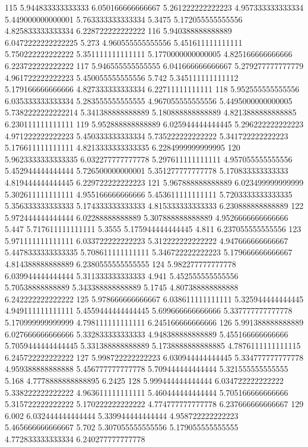 115 5.944833333333333 6.050166666666667 5.261222222222223 4.957333333333334 5.449000000000001 5.763333333333334 5.3475 5.172055555555556 4.825833333333334 6.228722222222222
116 5.940388888888889 6.0472222222222225 5.273 4.960555555555556 5.451611111111111 5.750222222222222 5.351111111111111 5.1770000000000005 4.825166666666666 6.223722222222222
117 5.946555555555555 6.041666666666667 5.279277777777779 4.961722222222223 5.450055555555556 5.742 5.345111111111112 5.179166666666666 4.827333333333334 6.22711111111111
118 5.952555555555556 6.035333333333334 5.283555555555555 4.967055555555556 5.4495000000000005 5.7382222222222214 5.341388888888889 5.180888888888889 4.8213888888888885 6.230111111111111
119 5.952888888888889 6.025944444444445 5.296222222222223 4.971222222222223 5.450333333333334 5.735222222222222 5.341722222222223 5.176611111111111 4.8213333333333335 6.2284999999999995
120 5.9623333333333335 6.032277777777778 5.297611111111111 4.957055555555556 5.452944444444444 5.726500000000001 5.351277777777778 5.170833333333333 4.819444444444445 6.229722222222223
121 5.967888888888889 6.023499999999999 5.302611111111111 4.955166666666666 5.453611111111111 5.7203333333333335 5.356333333333333 5.174333333333333 4.815333333333333 6.230888888888889
122 5.972444444444444 6.02288888888889 5.307888888888889 4.9526666666666666 5.447 5.717611111111111 5.3555 5.175944444444445 4.811 6.237055555555556
123 5.971111111111111 6.033722222222223 5.312222222222222 4.947666666666667 5.4478333333333335 5.708611111111111 5.346722222222223 5.179666666666667 4.814388888888889 6.2380555555555555
124 5.982277777777778 6.039944444444444 5.311333333333333 4.941 5.452555555555556 5.70538888888889 5.343388888888889 5.1745 4.807388888888888 6.242222222222222
125 5.978666666666667 6.038611111111111 5.325944444444445 4.949111111111111 5.4559444444444445 5.699666666666666 5.337777777777778 5.170999999999999 4.798111111111111 6.245166666666666
126 5.991388888888889 6.027666666666666 5.332833333333333 4.948388888888889 5.455166666666666 5.7059444444444445 5.331388888888889 5.1738888888888885 4.7876111111111115 6.245722222222222
127 5.998722222222223 6.030944444444445 5.334777777777778 4.959388888888888 5.456777777777778 5.709444444444444 5.321555555555555 5.168 4.7778888888888895 6.2425
128 5.999444444444444 6.034722222222222 5.338222222222222 4.963611111111111 5.460444444444444 5.705166666666666 5.315722222222222 5.170222222222222 4.774777777777778 6.237666666666667
129 6.002 6.032444444444444 5.339944444444444 4.958722222222223 5.465666666666667 5.702 5.307055555555556 5.179055555555555 4.772833333333334 6.240277777777778
